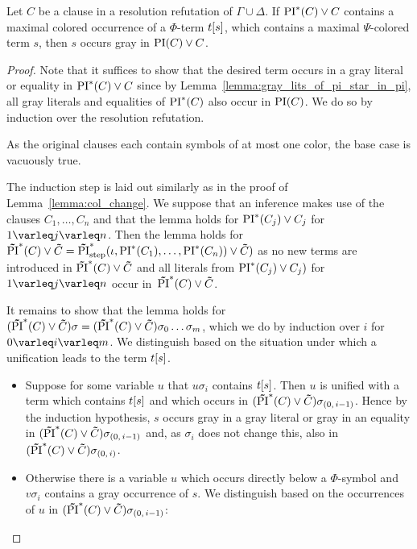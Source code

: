 \begin{lemma}
	\label{lemma:subterm_in_gray_lit}
	Let $C$ be a clause in a resolution refutation of $\Gamma \cup \Delta$.
	If $\operatorname{PI}^*(C) \lor C$ contains a maximal colored occurrence of a $\Phi$-term $t[s]$, which contains a maximal $\Psi$-colored term $s$, then $s$ occurs gray in $\operatorname{PI}(C) \lor C$.
\end{lemma}
\begin{proof}
	Note that it suffices to show that the desired term occurs in a gray literal or equality in $\operatorname{PI}^*(C) \lor C$
	since by Lemma~\ref{lemma:gray_lits_of_pi_star_in_pi}, all gray literals and equalities of $\operatorname{PI}^*(C)$ also occur in $\operatorname{PI}(C)$.
	We do so by induction over the resolution refutation.
	
	As the original clauses each contain symbols of at most one color, the base case is vacuously true.

	The induction step is laid out similarly as in the proof of Lemma~\ref{lemma:col_change}. 
	We suppose that an inference makes use of the clauses $C_1, \dots, C_n$ and that the lemma holds for $\operatorname{PI}^*(C_j) \lor C_j$ for $1\varleq j \varleq n$. 
	Then the lemma holds for $\bm\tilde{\operatorname{PI}}^{*}(C)\lor \bm\tilde{C} = \bm\tilde{\operatorname{PI}}^{*}_{\mathrm{step}}(\iota, \operatorname{PI}^*(C_1), \dots, \operatorname{PI}^*(C_n)) \lor \bm\tilde{C})$ as no new terms are introduced in $\bm\tilde{\operatorname{PI}}^{*}(C)\lor \bm\tilde{C}$ and all literals from $\operatorname{PI}^*(C_j) \lor C_j)$ for $1\varleq j \varleq n$ occur in~$\bm\tilde{\operatorname{PI}}^{*}(C)\lor \bm\tilde{C}$.

	It remains to show that the lemma holds for $(\bm\tilde{\operatorname{PI}}^{*}(C)\lor \bm\tilde{C})\sigma = (\bm\tilde{\operatorname{PI}}^{*}(C)\lor \bm\tilde{C})\sigma_0 \dots \sigma_m$, which we do by induction over $i$ for $0 \varleq i \varleq m$.
	We distinguish based on the situation under which a unification leads to the term $t[s]$.

	\begin{itemize}
		\item 
			Suppose for some variable $u$ that $u\sigma_i$ contains $t[s]$. 
			Then $u$ is unified with a term which contains $t[s]$ and which occurs in $(\bm\tilde{\operatorname{PI}}^{*}(C)\lor \bm\tilde{C})\sigma_{(0,\,i-1)}$.
			Hence by the induction hypothesis, $s$ occurs gray in a gray literal or gray in an equality in $(\bm\tilde{\operatorname{PI}}^{*}(C)\lor \bm\tilde{C})\sigma_{(0,\,i-1)}$ and, as $\sigma_i$ does not change this, also in $(\bm\tilde{\operatorname{PI}}^{*}(C)\lor \bm\tilde{C})\sigma_{(0,\,i)}$.

		\item 
			Otherwise there is a variable $u$ which occurs directly below a $\Phi$-symbol and $v\sigma_i$ contains a gray occurrence of $s$.
			We distinguish based on the occurrences of $u$ in $(\bm\tilde{\operatorname{PI}}^{*}(C)\lor \bm\tilde{C})\sigma_{(0,\,i-1)}$:


\end{itemize}
\end{proof}
